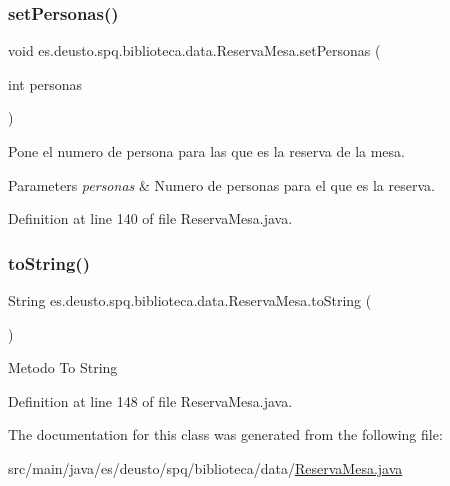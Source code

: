 \subsubsection{\texorpdfstring{set\+Personas()}{setPersonas()}}
{\footnotesize\ttfamily void es.\+deusto.\+spq.\+biblioteca.\+data.\+Reserva\+Mesa.\+set\+Personas (\begin{DoxyParamCaption}\item[{int}]{personas }\end{DoxyParamCaption})}

Pone el numero de persona para las que es la reserva de la mesa. 
\begin{DoxyParams}{Parameters}
{\em personas} & Numero de personas para el que es la reserva. \\
\hline
\end{DoxyParams}


Definition at line 140 of file Reserva\+Mesa.\+java.

\mbox{\label{classes_1_1deusto_1_1spq_1_1biblioteca_1_1data_1_1_reserva_mesa_a01e0cd01cb0b967cf11b9d2da905a8db}} 
\subsubsection{\texorpdfstring{to\+String()}{toString()}}
{\footnotesize\ttfamily String es.\+deusto.\+spq.\+biblioteca.\+data.\+Reserva\+Mesa.\+to\+String (\begin{DoxyParamCaption}{ }\end{DoxyParamCaption})}

Metodo To String 

Definition at line 148 of file Reserva\+Mesa.\+java.



The documentation for this class was generated from the following file\+:\begin{DoxyCompactItemize}
\item 
src/main/java/es/deusto/spq/biblioteca/data/\mbox{\hyperlink{_reserva_mesa_8java}{Reserva\+Mesa.\+java}}\end{DoxyCompactItemize}
